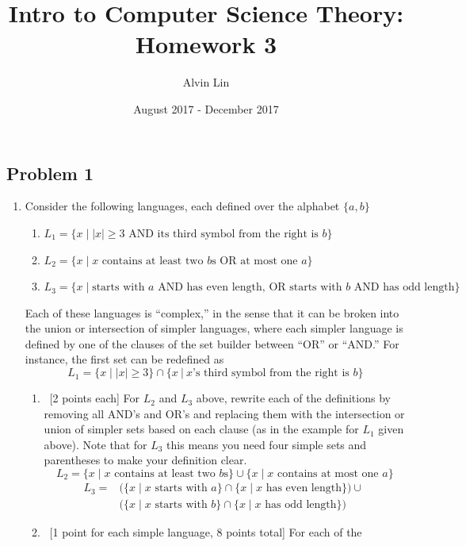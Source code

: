 \documentclass[letterpaper, 12pt]{math}
\title{Intro to Computer Science Theory: Homework 3}
\author{Alvin Lin}
\date{August 2017 - December 2017}
\begin{document}
\maketitle

\subsection*{Problem 1}

\begin{enumerate}
  \item Consider the following languages, each defined over the alphabet
  \( \{a,b\} \)
  \begin{enumerate}
    \item \( L_1 = \{x\mid|x|\geq3\text{ AND its third symbol from the right
    is } b\} \)
    \item \( L_2 = \{x\mid x\text{ contains at least two } b\text{s OR at most
    one } a\} \)
    \item \( L_3=\{x\mid\text{starts with }a\text{ AND has even length, OR
    starts with } b \text{ AND has odd length}\} \)
  \end{enumerate}
  Each of these languages is ``complex,'' in the sense that it can be broken
  into the union or intersection of simpler languages, where each simpler
  language is defined by one of the clauses of the set builder between ``OR''
  or ``AND.'' For instance, the first set can be redefined as
  \[ L_1 = \{x\mid|x|\geq 3\} \cap \{x~|~x\mbox{'s third symbol from the right
    is } b\} \]
  \begin{enumerate}
    \item ~[2 points each] For \( L_2 \) and \( L_3 \) above, rewrite each of
    the definitions by removing all AND's and OR's and replacing them with the
    intersection or union of simpler sets based on each clause (as in the
    example for \( L_1 \) given above). Note that for \( L_3 \) this means you
    need four simple sets and parentheses to make your definition clear.
    \[ L_2 = \{x\mid x\text{ contains at least two } b\text{s}\} \cup \{x\mid
      x\text{ contains at most one } a\} \]
    \begin{align*}
      L_3 =& \bigg(\{x\mid x\text{ starts with } a\}\cap\{x\mid x\text{ has even
        length}\}\bigg)\cup\ \\
      & \bigg(\{x\mid x\text{ starts with } b\}\cap
        \{x\mid x\text{ has odd length}\}\bigg)
    \end{align*}
    \item ~[1 point for each simple language, 8 points total] For each of the

\end{enumerate}
\end{enumerate}
\end{document}
